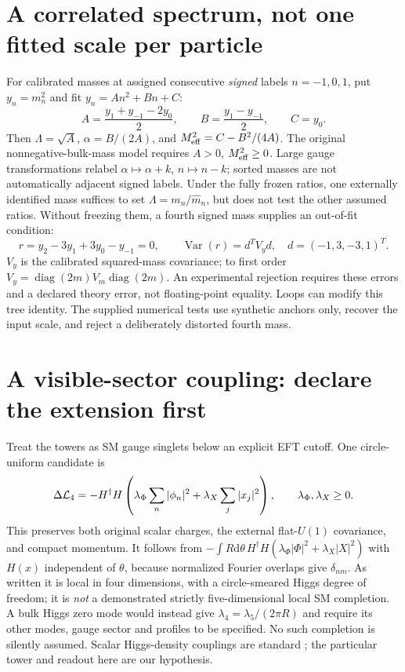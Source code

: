 \documentclass[11pt,a4paper]{article}
\newcommand{\dd}{\mathrm d}
\begin{document}
\section{A correlated spectrum, not one fitted scale per particle}
For calibrated masses at assigned consecutive \emph{signed} labels
$n=-1,0,1$, put $y_n=m_n^2$ and fit $y_n=An^2+Bn+C$:
\begin{equation}
 A=\frac{y_1+y_{-1}-2y_0}{2},\qquad
 B=\frac{y_1-y_{-1}}{2},\qquad C=y_0.
\end{equation}
Then $\Lambda=\sqrt A$, $\alpha=B/(2A)$, and
$M_{\rm eff}^2=C-B^2/(4A)$. The original nonnegative-bulk-mass
model requires $A>0$, $M_{\rm eff}^2\geq0$. Large gauge transformations
relabel $\alpha\mapsto\alpha+k$, $n\mapsto n-k$; sorted masses are
not automatically adjacent signed labels. Under the fully frozen ratios,
one externally identified mass suffices to set $\Lambda=m_n/\hat m_n$,
but does not test the other assumed ratios. Without freezing them, a
fourth signed mass supplies an out-of-fit condition:
\begin{equation}\label{eq:closure}
 r=y_2-3y_1+3y_0-y_{-1}=0,\qquad
 \operatorname{Var}(r)=d^T V_y d,\quad d=(-1,3,-3,1)^T .
\end{equation}
$V_y$ is the calibrated squared-mass covariance; to first order
$V_y=\operatorname{diag}(2m)V_m\operatorname{diag}(2m)$.
An experimental rejection requires these errors and a declared theory
error, not floating-point equality. Loops can modify this tree identity.
The supplied numerical tests use synthetic anchors only, recover the
input scale, and reject a deliberately distorted fourth mass.

\section{A visible-sector coupling: declare the extension first}
Treat the towers as SM gauge singlets below an explicit EFT cutoff.
One circle-uniform candidate is
\begin{equation}\label{eq:portal}
 \Delta{\cal L}_4=-H^\dagger H
 \left(\lambda_\Phi\sum_n|\phi_n|^2+
       \lambda_X\sum_j|x_j|^2\right),\qquad \lambda_\Phi,\lambda_X\geq0.
\end{equation}
This preserves both original scalar charges, the external flat-$U(1)$
covariance, and compact momentum. It follows from
$-\int R\dd\theta\,H^\dagger H(\lambda_\Phi|\Phi|^2+\lambda_X|X|^2)$
with $H(x)$ independent of $\theta$, because normalized Fourier overlaps
give $\delta_{nm}$. As written it is local in four dimensions, with a
circle-smeared Higgs degree of freedom; it is \emph{not} a demonstrated
strictly five-dimensional local SM completion. A bulk Higgs zero mode
would instead give $\lambda_4=\lambda_5/(2\pi R)$ and require its other
modes, gauge sector and profiles to be specified. No such completion is
silently assumed. Scalar Higgs-density couplings are standard
\cite{cline}; the particular tower and readout here are our hypothesis.
\end{document}
